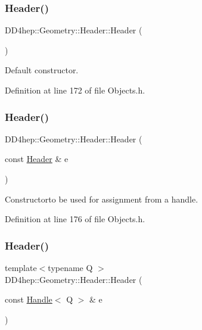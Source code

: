 \subsubsection{\texorpdfstring{Header()}{Header()}\hspace{0.1cm}{\footnotesize\ttfamily [1/4]}}
{\footnotesize\ttfamily D\+D4hep\+::\+Geometry\+::\+Header\+::\+Header (\begin{DoxyParamCaption}{ }\end{DoxyParamCaption})\hspace{0.3cm}{\ttfamily [inline]}}



Default constructor. 



Definition at line 172 of file Objects.\+h.

\hypertarget{class_d_d4hep_1_1_geometry_1_1_header_a613572c6f7759e5758865fd622fc54d7}{}\label{class_d_d4hep_1_1_geometry_1_1_header_a613572c6f7759e5758865fd622fc54d7} 
\subsubsection{\texorpdfstring{Header()}{Header()}\hspace{0.1cm}{\footnotesize\ttfamily [2/4]}}
{\footnotesize\ttfamily D\+D4hep\+::\+Geometry\+::\+Header\+::\+Header (\begin{DoxyParamCaption}\item[{const \hyperlink{class_d_d4hep_1_1_geometry_1_1_header}{Header} \&}]{e }\end{DoxyParamCaption})\hspace{0.3cm}{\ttfamily [inline]}}



Constructorto be used for assignment from a handle. 



Definition at line 176 of file Objects.\+h.

\hypertarget{class_d_d4hep_1_1_geometry_1_1_header_aa4432291f46425a3fb41e26576d7e737}{}\label{class_d_d4hep_1_1_geometry_1_1_header_aa4432291f46425a3fb41e26576d7e737} 
\subsubsection{\texorpdfstring{Header()}{Header()}\hspace{0.1cm}{\footnotesize\ttfamily [3/4]}}
{\footnotesize\ttfamily template$<$typename Q $>$ \\
D\+D4hep\+::\+Geometry\+::\+Header\+::\+Header (\begin{DoxyParamCaption}\item[{const \hyperlink{class_d_d4hep_1_1_handle}{Handle}$<$ Q $>$ \&}]{e }\end{DoxyParamCaption})\hspace{0.3cm}{\ttfamily [inline]}}



